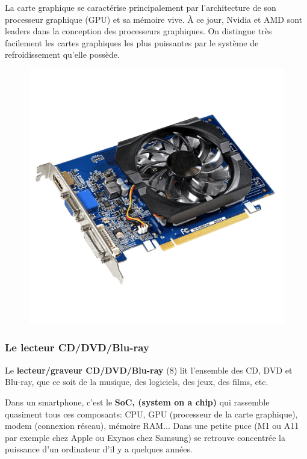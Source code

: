 \documentclass[11pt, a4paper]{book}
\begin{document}
La { carte graphique} se caractérise principalement par l'architecture de son processeur graphique (GPU) et sa mémoire vive. À ce jour, Nvidia et AMD sont leaders dans la conception des processeurs graphiques. On distingue très facilement les cartes graphiques les plus puissantes par le système de refroidissement qu’elle possède.
	
	\begin{figure}[ht!]
	\centering
	\includegraphics[scale=.2]{images/carte_graphique}

\end{figure}

\vspace{10pt}
\subsubsection{  Le lecteur CD/DVD/Blu-ray } 
Le {\bf lecteur/graveur CD/DVD/Blu-ray } (8) lit l'ensemble des CD, DVD et Blu-ray, que ce soit de la musique, des logiciels, des jeux, des films, etc.


\begin{remarque}
Dans un smartphone, c'est le {\bf SoC, (system on a chip)} qui rassemble quasiment tous ces composants: CPU, GPU (processeur de la carte graphique), modem (connexion réseau), mémoire RAM... Dans une petite puce (M1 ou A11 par exemple chez Apple ou Exynos chez Samsung) se retrouve concentrée la puissance d'un ordinateur d'il y a quelques années.
\end{remarque}
\end{document}
